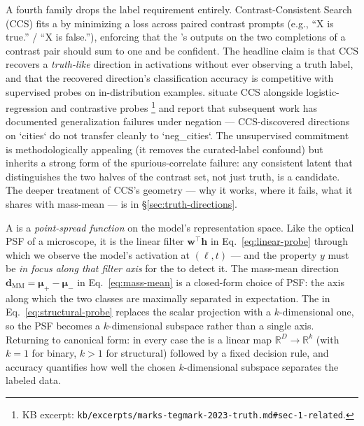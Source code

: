 A fourth  family drops the label requirement entirely. Contrast-Consistent
Search (CCS)  fits a
 by minimizing a  loss across paired
contrast prompts (e.g., ``X is true.'' / ``X is false.''), enforcing
that the 's outputs on the two completions of a contrast pair
should sum to one and be confident. The headline claim is that CCS
recovers a \emph{truth-like} direction in  activations without
ever observing a truth label, and that the recovered direction's
classification accuracy is competitive with supervised probes on
in-distribution examples. \citet{marks-tegmark-2023-truth} situate
CCS alongside logistic-regression and contrastive probes
\citep[\S 1.1]{marks-tegmark-2023-truth}\footnote{KB excerpt:
\nolinkurl{kb/excerpts/marks-tegmark-2023-truth.md#sec-1-related}.} and
report that subsequent work has documented generalization failures
under negation — CCS-discovered directions on `cities` do not transfer
cleanly to `neg\_cities`. The unsupervised commitment is methodologically
appealing (it removes the curated-label confound) but inherits a strong
form of the spurious-correlate failure: any consistent latent 
that distinguishes the two halves of the contrast set, not just truth,
is a candidate. The deeper treatment of CCS's geometry — why it works,
where it fails, what it shares with mass-mean — is in
\S\ref{sec:truth-directions}.

\begin{intuition}
A  is a \emph{point-spread function} on the model's representation
space. Like the optical PSF of a microscope, it is the linear filter
$\mathbf{w}^\top \mathbf{h}$ in Eq.~\eqref{eq:linear-probe} through which
we observe the model's activation at $(\ell, t)$ — and the property $y$
must be \emph{in focus along that filter axis} for the  to detect
it. The mass-mean direction
$\mathbf{d}_{\mathrm{MM}} = \boldsymbol{\mu}_+ - \boldsymbol{\mu}_-$ in
Eq.~\eqref{eq:mass-mean} is a closed-form choice of PSF: the axis along
which the two classes are maximally separated in expectation. The
 in Eq.~\eqref{eq:structural-probe} replaces the scalar
projection with a $k$-dimensional one, so the PSF becomes a
$k$-dimensional subspace rather than a single axis. Returning to
canonical form: in every case the  is a linear map
$\mathbb{R}^D \to \mathbb{R}^k$ (with $k = 1$ for binary, $k > 1$ for
structural) followed by a fixed decision rule, and  accuracy
quantifies how well the chosen $k$-dimensional subspace separates the
labeled data.
\end{intuition}

